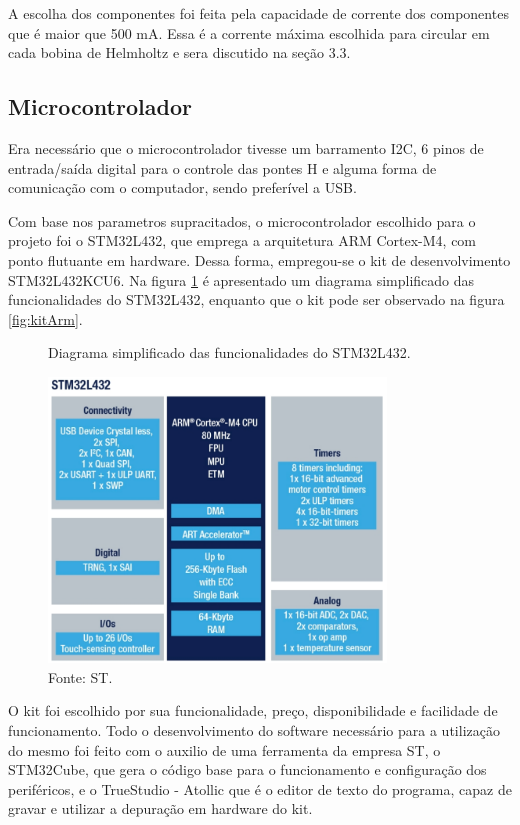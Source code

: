 A escolha dos componentes foi feita pela capacidade de corrente dos componentes que é maior que 500 mA. Essa é a corrente máxima escolhida para circular em cada bobina de Helmholtz e sera discutido na seção 3.3.

\subsection{Microcontrolador}

Era necessário que o microcontrolador tivesse um barramento I2C, 6 pinos de entrada/saída digital para o controle das pontes H e alguma forma de comunicação com o computador, sendo preferível a USB.

Com base nos parametros supracitados, o microcontrolador escolhido para o projeto foi o STM32L432, que emprega a arquitetura ARM Cortex-M4, com ponto flutuante em hardware. Dessa forma, empregou-se o kit de desenvolvimento STM32L432KCU6. Na figura \ref{fig:diagArm} é apresentado um diagrama simplificado das funcionalidades do STM32L432, enquanto que o kit pode ser observado na figura \ref{fig:kitArm}.

\begin{figure}[H]
    \centering
     \caption{Diagrama simplificado das funcionalidades do  STM32L432.}
     \includegraphics[width=0.8\textwidth]{./img/imagensExplicacoes/diagramaArm.png}
     \caption*{Fonte: ST.}
     \label{fig:diagArm}
\end{figure}


O kit foi escolhido por sua funcionalidade, preço, disponibilidade e facilidade de funcionamento. Todo o desenvolvimento do software necessário para a utilização do mesmo foi feito com o auxilio de uma ferramenta da empresa ST, o STM32Cube, que gera o código base para o funcionamento e configuração dos periféricos, e o TrueStudio - Atollic que é o editor de texto do programa, capaz de gravar e utilizar a depuração em hardware do kit.

